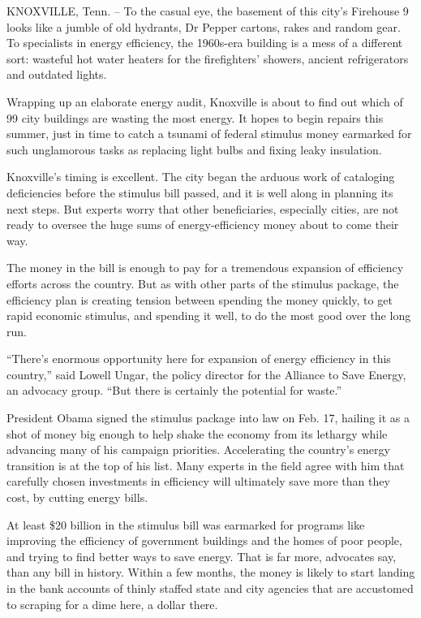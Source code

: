 \documentclass[12pt,a4paper,onecolumn]{article}
\begin{document}
\begin{CJK*}{GBK}{song}
KNOXVILLE, Tenn. -- To the casual eye, the basement of this city's Firehouse 9 looks like a jumble
of old hydrants, Dr Pepper cartons, rakes and random gear. To specialists in energy efficiency, the
1960s-era building is a mess of a different sort: wasteful hot water heaters for the firefighters'
showers, ancient refrigerators and outdated lights.

Wrapping up an elaborate energy audit, Knoxville is about to find out which of 99 city buildings are
wasting the most energy. It hopes to begin repairs this summer, just in time to catch a tsunami of
federal stimulus money earmarked for such unglamorous tasks as replacing light bulbs and fixing
leaky insulation.

Knoxville's timing is excellent. The city began the arduous work of cataloging deficiencies before
the stimulus bill passed, and it is well along in planning its next steps. But experts worry that
other beneficiaries, especially cities, are not ready to oversee the huge sums of energy-efficiency
money about to come their way.

The money in the bill is enough to pay for a tremendous expansion of efficiency efforts across the
country. But as with other parts of the stimulus package, the efficiency plan is creating tension
between spending the money quickly, to get rapid economic stimulus, and spending it well, to do the
most good over the long run.

``There's enormous opportunity here for expansion of energy efficiency in this country,'' said
Lowell Ungar, the policy director for the Alliance to Save Energy, an advocacy group. ``But there is
certainly the potential for waste.''

President Obama signed the stimulus package into law on Feb. 17, hailing it as a shot of money big
enough to help shake the economy from its lethargy while advancing many of his campaign priorities.
Accelerating the country's energy transition is at the top of his list. Many experts in the field
agree with him that carefully chosen investments in efficiency will ultimately save more than they
cost, by cutting energy bills.

At least \$20 billion in the stimulus bill was earmarked for programs like improving the efficiency
of government buildings and the homes of poor people, and trying to find better ways to save energy.
That is far more, advocates say, than any bill in history. Within a few months, the money is likely
to start landing in the bank accounts of thinly staffed state and city agencies that are accustomed
to scraping for a dime here, a dollar there.


\end{CJK*}
\end{document}
